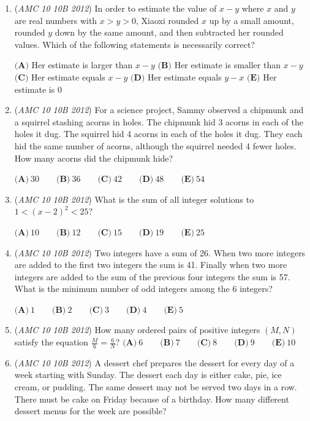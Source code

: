 \begin{enumerate}
 $\textbf{(A)}\ 18\qquad\textbf{(B)}\ 20\qquad\textbf{(C)}\ 21\qquad\textbf{(D)}\ 22\qquad\textbf{(E)}\ 24$


	\item (\textit{AMC 10 10B 2012}) In order to estimate the value of $x-y$ where $x$ and $y$ are real numbers with $x > y > 0$, Xiaoxi rounded $x$ up by a small amount, rounded $y$ down by the same amount, and then subtracted her rounded values. Which of the following statements is necessarily correct? 


 $\textbf{(A)}$ Her estimate is larger than $x-y$
$\textbf{(B)}$ Her estimate is smaller than $x-y$
$\textbf{(C)}$ Her estimate equals $x-y$
$\textbf{(D)}$ Her estimate equals $y - x$
$\textbf{(E)}$ Her estimate is $0$


	\item (\textit{AMC 10 10B 2012}) For a science project, Sammy observed a chipmunk and a squirrel stashing acorns in holes. The chipmunk hid 3 acorns in each of the holes it dug. The squirrel hid 4 acorns in each of the holes it dug. They each hid the same number of acorns, although the squirrel needed 4 fewer holes. How many acorns did the chipmunk hide?


 $\textbf{(A)}\ 30\qquad\textbf{(B)}\ 36\qquad\textbf{(C)}\ 42\qquad\textbf{(D)}\ 48\qquad\textbf{(E)}\ 54$


	\item (\textit{AMC 10 10B 2012}) What is the sum of all integer solutions to $1<(x-2)^2<25$?


 $\textbf{(A)}\ 10\qquad\textbf{(B)}\ 12\qquad\textbf{(C)}\ 15\qquad\textbf{(D)}\ 19\qquad\textbf{(E)}\ 25$


	\item (\textit{AMC 10 10B 2012}) Two integers have a sum of 26. When two more integers are added to the first two integers the sum is 41. Finally when two more integers are added to the sum of the previous four integers the sum is 57. What is the minimum number of odd integers among the 6 integers?


 $\textbf{(A)}\ 1\qquad\textbf{(B)}\ 2\qquad\textbf{(C)}\ 3\qquad\textbf{(D)}\ 4\qquad\textbf{(E)}\ 5$


	\item (\textit{AMC 10 10B 2012}) How many ordered pairs of positive integers $(M,N)$ satisfy the equation $\frac{M}{6}=\frac{6}{N}?$
$\textbf{(A)}\ 6\qquad\textbf{(B)}\ 7\qquad\textbf{(C)}\ 8\qquad\textbf{(D)}\ 9\qquad\textbf{(E)}\ 10$


	\item (\textit{AMC 10 10B 2012}) A dessert chef prepares the dessert for every day of a week starting with Sunday. The dessert each day is either cake, pie, ice cream, or pudding. The same dessert may not be served two days in a row. There must be cake on Friday because of a birthday. How many different dessert menus for the week are possible?



\end{enumerate}
